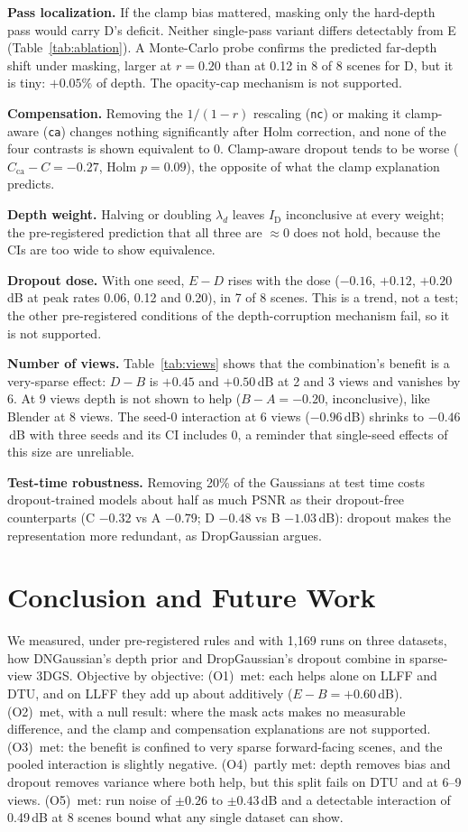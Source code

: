 \documentclass[conference]{IEEEtran}
\newcommand{\dB}{\,dB}
\newcommand{\ID}{I_{\mathrm{D}}}
\begin{document}
\textbf{Pass localization.} If the clamp bias mattered, masking only the hard-depth pass would carry D's deficit. Neither single-pass variant differs detectably from E (Table~\ref{tab:ablation}). A Monte-Carlo probe confirms the predicted far-depth shift under masking, larger at $r=0.20$ than at 0.12 in 8 of 8 scenes for D, but it is tiny: $+0.05\%$ of depth. The opacity-cap mechanism is not supported.

\textbf{Compensation.} Removing the $1/(1-r)$ rescaling (\texttt{nc}) or making it clamp-aware (\texttt{ca}) changes nothing significantly after Holm correction, and none of the four contrasts is shown equivalent to 0. Clamp-aware dropout tends to be worse ($C_{\text{ca}}-C=-0.27$, Holm $p=0.09$), the opposite of what the clamp explanation predicts.

\textbf{Depth weight.} Halving or doubling $\lambda_d$ leaves $\ID$ inconclusive at every weight; the pre-registered prediction that all three are $\approx 0$ does not hold, because the CIs are too wide to show equivalence.

\textbf{Dropout dose.} With one seed, $E-D$ rises with the dose ($-0.16$, $+0.12$, $+0.20$\dB{} at peak rates 0.06, 0.12 and 0.20), in 7 of 8 scenes. This is a trend, not a test; the other pre-registered conditions of the depth-corruption mechanism fail, so it is not supported.

\textbf{Number of views.} Table~\ref{tab:views} shows that the combination's benefit is a very-sparse effect: $D-B$ is $+0.45$ and $+0.50$\dB{} at 2 and 3 views and vanishes by 6. At 9 views depth is not shown to help ($B-A=-0.20$, inconclusive), like Blender at 8 views. The seed-0 interaction at 6 views ($-0.96$\dB) shrinks to $-0.46$\dB{} with three seeds and its CI includes 0, a reminder that single-seed effects of this size are unreliable.

\textbf{Test-time robustness.} Removing 20\% of the Gaussians at test time costs dropout-trained models about half as much PSNR as their dropout-free counterparts (C $-0.32$ vs A $-0.79$; D $-0.48$ vs B $-1.03$\dB): dropout makes the representation more redundant, as DropGaussian argues.

\section{Conclusion and Future Work}
We measured, under pre-registered rules and with 1,169 runs on three datasets, how DNGaussian's depth prior and DropGaussian's dropout combine in sparse-view 3DGS. Objective by objective: (O1)~met: each helps alone on LLFF and DTU, and on LLFF they add up about additively ($E-B=+0.60$\dB). (O2)~met, with a null result: where the mask acts makes no measurable difference, and the clamp and compensation explanations are not supported. (O3)~met: the benefit is confined to very sparse forward-facing scenes, and the pooled interaction is slightly negative. (O4)~partly met: depth removes bias and dropout removes variance where both help, but this split fails on DTU and at 6--9 views. (O5)~met: run noise of $\pm0.26$ to $\pm0.43$\dB{} and a detectable interaction of 0.49\dB{} at 8 scenes bound what any single dataset can show.
\end{document}
